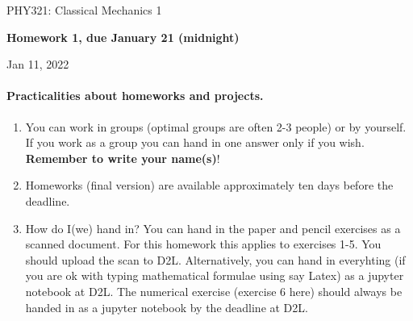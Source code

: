 \documentclass[%
oneside,                 %
final,                   %
10pt]{article}
\begin{document}

\newcommand{\exercisesection}[1]{\subsection*{#1}}






\thispagestyle{empty}

\begin{center}
{\LARGE\bf
\begin{spacing}{1.25}
PHY321: Classical Mechanics 1
\end{spacing}
}
\end{center}


\begin{center}
{\bf Homework 1, due January 21 (midnight)${}^{}$} \\ [0mm]
\end{center}

\begin{center}
\end{center}
    

\begin{center}
Jan 11, 2022
\end{center}

\vspace{1cm}


\paragraph{Practicalities about  homeworks and projects.}
\begin{enumerate}
\item You can work in groups (optimal groups are often 2-3 people) or by yourself. If you work as a group you can hand in one answer only if you wish. \textbf{Remember to write your name(s)}!

\item Homeworks (final version) are available approximately ten days before the  deadline. 

\item How do I(we)  hand in?  You can hand in the paper and pencil exercises as a scanned document. For this homework this applies to exercises 1-5. You should upload the scan to D2L. Alternatively, you can hand in everyhting (if you are ok with typing mathematical formulae using say Latex) as a jupyter notebook at D2L. The numerical exercise (exercise 6 here) should always be handed in as a jupyter notebook by the deadline at D2L. 
\end{enumerate}
\end{document}
